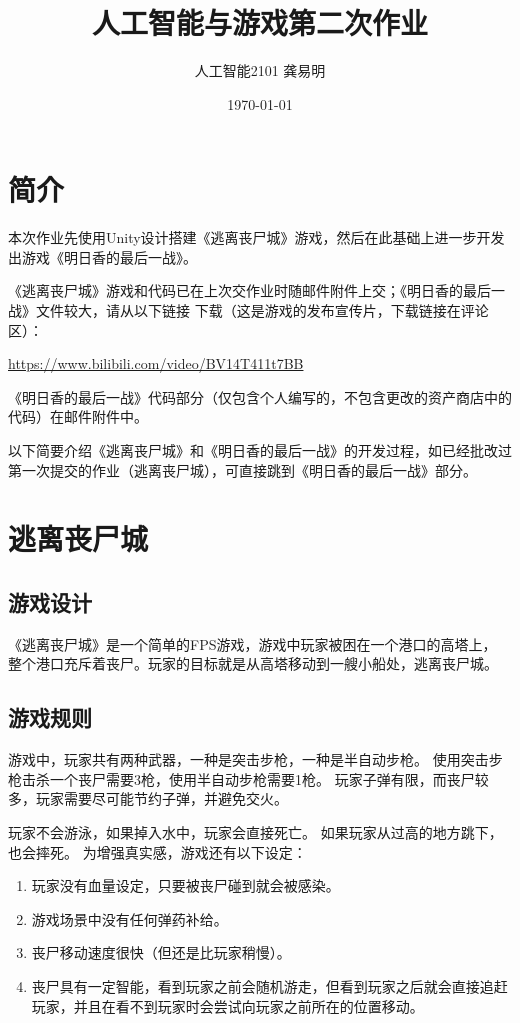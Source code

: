 \documentclass{article}
\title{人工智能与游戏第二次作业}
\author{人工智能2101 龚易明}
\date{\today}
\begin{document}
\maketitle

\section{简介}

本次作业先使用Unity设计搭建《逃离丧尸城》游戏，然后在此基础上进一步开发出游戏《明日香的最后一战》。

《逃离丧尸城》游戏和代码已在上次交作业时随邮件附件上交；《明日香的最后一战》文件较大，请从以下链接
下载（这是游戏的发布宣传片，下载链接在评论区）：

\href{https://www.bilibili.com/video/BV14T411t7BB}{https://www.bilibili.com/video/BV14T411t7BB}

《明日香的最后一战》代码部分（仅包含个人编写的，不包含更改的资产商店中的代码）在邮件附件中。

以下简要介绍《逃离丧尸城》和《明日香的最后一战》的开发过程，如已经批改过第一次提交的作业（逃离丧尸城），可直接跳到《明日香的最后一战》部分。

\section{逃离丧尸城}

\subsection{游戏设计}

《逃离丧尸城》是一个简单的FPS游戏，游戏中玩家被困在一个港口的高塔上，
整个港口充斥着丧尸。玩家的目标就是从高塔移动到一艘小船处，逃离丧尸城。

\subsection{游戏规则}

游戏中，玩家共有两种武器，一种是突击步枪，一种是半自动步枪。
使用突击步枪击杀一个丧尸需要3枪，使用半自动步枪需要1枪。
玩家子弹有限，而丧尸较多，玩家需要尽可能节约子弹，并避免交火。

玩家不会游泳，如果掉入水中，玩家会直接死亡。
如果玩家从过高的地方跳下，也会摔死。
为增强真实感，游戏还有以下设定：

\begin{enumerate}
    \item 玩家没有血量设定，只要被丧尸碰到就会被感染。
    \item 游戏场景中没有任何弹药补给。
    \item 丧尸移动速度很快（但还是比玩家稍慢）。
    \item 丧尸具有一定智能，看到玩家之前会随机游走，但看到玩家之后就会直接追赶玩家，并且在看不到玩家时会尝试向玩家之前所在的位置移动。
\end{enumerate}
\end{document}
